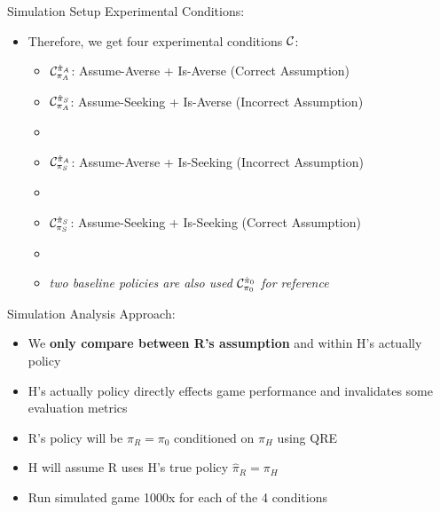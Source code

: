 \documentclass[aspectratio=1610, xcolor=dvipsnames]{packages/beamer}
\begin{document}
\begin{frame}{Simulation Setup}
    Experimental Conditions: \begin{itemize}
        \item Therefore, we get four experimental conditions $\cond$:
        \begin{itemize} \vspace{10}
            \item $\cond[A][A]$: Assume-Averse + Is-Averse   (Correct Assumption) \vspace{10}
            \item $\cond[S][A]$: Assume-Seeking + Is-Averse  (Incorrect Assumption) \\
            \item[]
            \item $\cond[A][S]$: Assume-Averse + Is-Seeking  (Incorrect Assumption) \\
            \item[]
            \item $\cond[S][S]$: Assume-Seeking + Is-Seeking (Correct Assumption) \\
            \item[]
            \item \textit{two baseline policies are also used $\cond[0][0]$ for reference}
        \end{itemize}
    \end{itemize}
\end{frame}

\begin{frame}{Simulation Analysis}
    Approach: \begin{itemize}
        \item We \textbf{only compare between R's assumption} and within H's actually policy
        \item H's actually policy directly effects game performance and invalidates some evaluation metrics
        \item R's policy will be $\pi_R=\pi_0$ conditioned on $\hat{\pi}_{H}$ using \ac{QRE}
        \item H will assume R uses H's true policy $\hat{\pi}_{R}=\pi_{H}$
        \item Run simulated game 1000x for each of the 4 conditions
    \end{itemize}
\end{frame}
\end{document}
